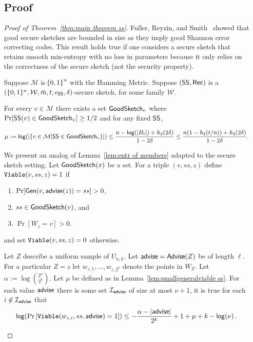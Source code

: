 \subsection{Proof}
\begin{proof}[Proof of Theorem~\ref{thm:main theorem ss}]

Fuller, Reyzin, and Smith~\cite[Lemma 7.3]{fuller2020fuzzy} showed that good secure sketches are bounded in size as they imply good Shannon error correcting codes.  This result holds true if one considers a secure sketch that retains smooth min-entropy with no loss in parameters because it only relies on the correctness of the secure sketch (not the security property).  

\begin{lemma}
\label{lem:smallgeneralviable ss}
    Suppose $\mathcal{M}$ is $\!\left\{ 0,1 \right\}^{n}$ with the Hamming Metric. Suppose $({\mathsf{SS}}, {\mathsf{Rec}})$ is a $(\{0, 1\}^n, \mathcal{W}, \tilde{m}, t, \epsilon_{\mathsf{SS}}, \delta)$-secure sketch, for some family $\mathcal{W}$. 
    
   For every $v\in \mathcal{M}$ there exists a set $\mathsf{GoodSketch}_v$ where $\Pr[{\mathsf{SS}}(v)\in \mathsf{GoodSketch}_v] \ge 1/2$ and for any fixed ${\mathsf{SS}}$,
    
    \[
   \mu:= \mathsf{log}\!\left(|\{v \in \mathcal{M} | {\mathsf{SS}} \in \mathsf{GoodSketch}_v\}|\right) \le \frac{n - \mathsf{log}\!\left(|B_t|\right) +h_2(2\delta)}{1-2\delta} \le \frac{n(1-h_2(t/n)) +h_2(2\delta)}{1-2\delta}.
    \]
\end{lemma}

We present an analog of Lemma~\ref{lem:entr of members} adapted to the secure sketch setting. Let $\mathsf{GoodSketch}(x)$ be a set. For a triple $(v, ss, z)$ define $\mathtt{Viable}(v, ss, z)=1$ if
\begin{enumerate}
\itemsep0em
\item $\Pr[{\mathsf{Gen}}(v, {\mathsf{advise}}(z)) = ss]>0$,
\item $ss\in\mathsf{GoodSketch}(v)$, and
\item $\Pr[W_z = v]>0$.
\end{enumerate}
and set $\mathtt{Viable}(v, ss, z)=0$ otherwise. 

\begin{lemma}
\label{lem:ent members ss}
Let $Z$ describe a uniform sample of $U_{n,k}$.  Let ${\mathsf{advise}} = {\mathsf{Advise}}(Z)$ be of length $\ell$.
 For a particular $Z=z$ let $w_{z,1},..., w_{z,2^k}$ denote the points in $W_Z$. Let $\alpha:= \log {2^n\choose 2^k}$.  Let $\mu$ be defined as in Lemma~\ref{lem:smallgeneralviable ss}. 
For each value ${\mathsf{advise}}$ there is some set $\mathcal{I}_{{\mathsf{advise}}}$ of size at most $\nu+1$, it is true for each $i\not \in \mathcal{I}_{\mathsf{advise}}$ that
\[
\mathsf{log}\!\left(\Pr\left[\mathtt{Viable}(w_{z,i}, ss, {\mathsf{advise}}) = 1 \right]\right)\le -\frac{\alpha -|{\mathsf{advise}}| }{2^k}+1+\mu+k-\mathsf{log}\!\left(\nu\right).
\]
\end{lemma}


\end{proof}
